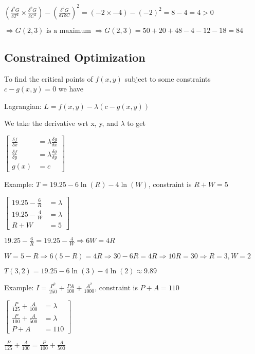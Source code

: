 \documentclass[12pt]{article}
\begin{document}
$(\frac{\delta^{2}G}{\delta T^{2}} \times \frac{\delta^{2} G}{\delta C^{2}}) - (\frac{\delta^{2}G}{\delta T \delta C})^{2} = (-2 \times -4) - (-2)^{2} = 8 - 4 = 4 > 0$

$\Rightarrow G(2, 3) \text{ is a maximum } \Rightarrow G(2,3) = 50 + 20 + 48 - 4 - 12 - 18 = 84$

\subsection{Constrained Optimization}

To find the critical points of $f(x,y)$ subject to some constraints $c - g(x,y) = 0$ we have

Lagrangian: $L = f(x,y) - \lambda(c - g(x,y))$

We take the derivative wrt x, y, and $\lambda$ to get

$\begin{bmatrix}
    \frac{\delta f}{\delta x} & = \lambda\frac{\delta g}{\delta x} \\
    \frac{\delta f}{\delta y} & = \lambda\frac{\delta g}{\delta y} \\
    g(x) & = c
\end{bmatrix}$

Example: $T = 19.25 - 6\ln(R) - 4\ln(W)$, constraint is $R + W = 5$

$\begin{bmatrix}
    19.25 - \frac{6}{R} & = \lambda \\
    19.25 - \frac{4}{W} & = \lambda \\
    R + W & = 5
\end{bmatrix}$

$19.25 - \frac{6}{R} = 19.25 - \frac{4}{W} \Rightarrow 6W = 4R$

$W = 5 - R \Rightarrow 6(5 - R) = 4R \Rightarrow 30 - 6R = 4R \Rightarrow 10R = 30 \Rightarrow R = 3, W = 2$

$T(3, 2) = 19.25 - 6\ln(3) - 4\ln(2) \approx 9.89$

Example: $I = \frac{P^{2}}{250} + \frac{PA}{100} + \frac{A^{2}}{1000}$, constraint is $P + A = 110$

$\begin{bmatrix}
    \frac{P}{125} + \frac{A}{100} & = \lambda \\
    \frac{P}{100} + \frac{A}{500} & = \lambda \\
    P + A & = 110
\end{bmatrix}$

$\frac{P}{125} + \frac{A}{100} = \frac{P}{100} + \frac{A}{500}$
\end{document}
